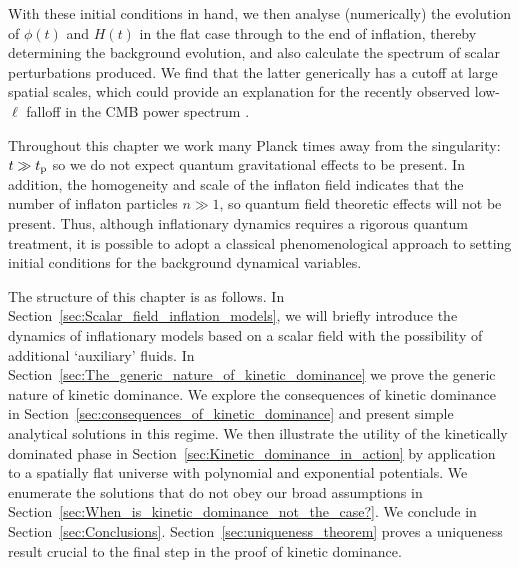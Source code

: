 With these initial conditions in hand, we then analyse (numerically) the evolution of \(\phi(t)\) and \(H(t)\) in the flat case through to the end of inflation, thereby determining the background evolution, and also calculate the spectrum of scalar perturbations produced. We find that the latter generically has a cutoff at large spatial scales, which could provide an explanation for the recently observed low-\(\ell\) falloff in the CMB power spectrum \citep{hinshaw_nine-year_2012,planck_collaboration_planck_2013}.
 
Throughout this chapter we work many Planck times away from the singularity: \(t\gg t_{\mathrm{p}}\) so we do not expect quantum gravitational effects to be present.  In addition, the homogeneity and scale of the inflaton field indicates that the number of inflaton particles \(n\gg1\), so quantum field theoretic effects will not be present.  Thus, although inflationary dynamics requires a rigorous quantum treatment, it is possible to adopt a classical phenomenological approach to setting initial conditions for the background dynamical variables.  

The structure of this chapter is as follows.  In Section~\ref{sec:Scalar_field_inflation_models}, we will briefly introduce the dynamics of inflationary models based on a scalar field with the possibility of additional `auxiliary' fluids.  In Section~\ref{sec:The_generic_nature_of_kinetic_dominance} we prove the generic nature of kinetic dominance.  We explore the consequences of kinetic dominance in Section~\ref{sec:consequences_of_kinetic_dominance} and present simple analytical solutions in this regime.  We then illustrate the utility of the kinetically dominated phase in Section~\ref{sec:Kinetic_dominance_in_action} by application to a spatially flat universe with polynomial and exponential potentials.  We enumerate the solutions that do not obey our broad assumptions in Section~\ref{sec:When_is_kinetic_dominance_not_the_case?}.  We conclude in Section~\ref{sec:Conclusions}. Section~\ref{sec:uniqueness_theorem} proves a uniqueness result crucial to the final step in the proof of kinetic dominance.  

